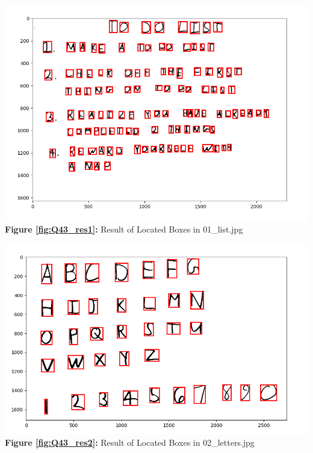 \documentclass{article}
\begin{document}
	\begin{minipage}{0.48\linewidth}
		\centering
		\includegraphics[width=\linewidth]{./Q43_res1.png}
		\textbf{Figure \ref{fig:Q43_res1}:} Result of Located Boxes in 01\_list.jpg %
		\label{fig:Q43_res1}         %
	\end{minipage}
	\hfill
	\begin{minipage}{0.48\linewidth}
		\centering
		\includegraphics[width=1.1\linewidth]{./Q43_res2.png}
		\textbf{Figure \ref{fig:Q43_res2}:} Result of Located Boxes in 02\_letters.jpg  %
		\label{fig:Q43_res2}         %
	\end{minipage}	
	\newline	
	\newline
	
\end{document}
